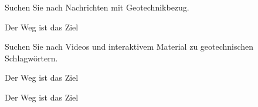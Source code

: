 Suchen Sie nach Nachrichten mit Geotechnikbezug.

\begin{solution}
Der Weg ist das Ziel 
\end{solution}


Suchen Sie nach Videos und interaktivem Material zu geotechnischen Schlagwörtern.

\begin{solution}
Der Weg ist das Ziel 
\end{solution}



\begin{solution}
    Der Weg ist das Ziel 
\end{solution}


